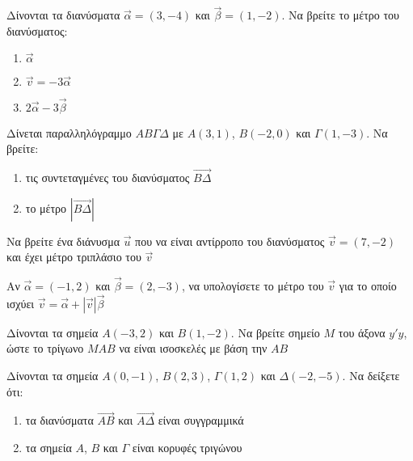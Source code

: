 \documentclass[greek]{beamer}
\begin{document}
\begin{askisi}
  Δίνονται τα διανύσματα $\vec{α}=(3,-4)$ και $\vec{β}=(1,-2)$. Να βρείτε το μέτρο του διανύσματος:
  \begin{enumerate}
    \item<1-> $\vec{α}$
    \item<2-> $\vec{v}=-3\vec{α}$
    \item<3-> $2\vec{α}-3\vec{β}$
  \end{enumerate}

\end{askisi}

\begin{askisi}
  Δίνεται παραλληλόγραμμο $ΑΒΓΔ$ με $Α(3,1)$, $Β(-2,0)$ και $Γ(1,-3)$. Να βρείτε:
  \begin{enumerate}
    \item<1-> τις συντεταγμένες του διανύσματος $\overrightarrow{ΒΔ}$
    \item<2-> το μέτρο $|\overrightarrow{ΒΔ}|$
  \end{enumerate}

\end{askisi}

\begin{askisi}
  Να βρείτε ένα διάνυσμα $\vec{u}$ που να είναι αντίρροπο του διανύσματος $\vec{v}=(7,-2)$ και έχει μέτρο τριπλάσιο του $\vec{v}$

\end{askisi}

\begin{askisi}
  Αν $\vec{α}=(-1,2)$ και $\vec{β}=(2,-3)$, να υπολογίσετε το μέτρο του $\vec{v}$ για το οποίο ισχύει $\vec{v}=\vec{α}+|\vec{v}|\vec{β}$

\end{askisi}

\begin{askisi}
  Δίνονται τα σημεία $Α(-3,2)$ και $Β(1,-2)$. Να βρείτε σημείο $Μ$ του άξονα $y'y$, ώστε το τρίγωνο $ΜΑΒ$ να είναι ισοσκελές με βάση την $ΑΒ$

\end{askisi}

\begin{askisi}
  Δίνονται τα σημεία $Α(0,-1)$, $Β(2,3)$, $Γ(1,2)$ και $Δ(-2,-5)$. Να δείξετε ότι:
  \begin{enumerate}
    \item<1-> τα διανύσματα $\overrightarrow{ΑΒ}$ και $\overrightarrow{ΑΔ}$ είναι συγγραμμικά
    \item<2-> τα σημεία $Α$, $Β$ και $Γ$ είναι κορυφές τριγώνου
  \end{enumerate}

\end{askisi}
\end{document}
